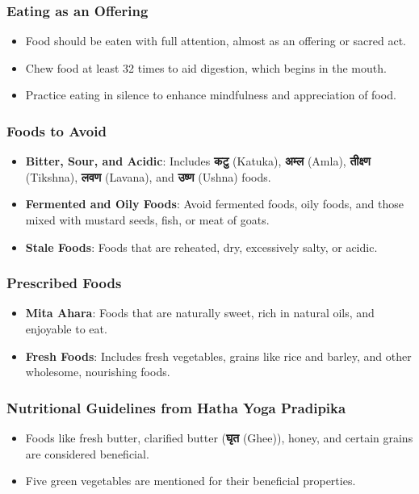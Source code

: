 \begin{frame}[fragile]\frametitle{Eating as an Offering}
    \begin{itemize}
        \item Food should be eaten with full attention, almost as an offering or sacred act.
        \item Chew food at least 32 times to aid digestion, which begins in the mouth.
        \item Practice eating in silence to enhance mindfulness and appreciation of food.
    \end{itemize}
\end{frame}


\begin{frame}[fragile]\frametitle{Foods to Avoid}
    \begin{itemize}
        \item \textbf{Bitter, Sour, and Acidic}: Includes \textbf{कटु} (Katuka), \textbf{अम्ल} (Amla), \textbf{तीक्ष्ण} (Tikshna), \textbf{लवण} (Lavana), and \textbf{उष्ण} (Ushna) foods.
        \item \textbf{Fermented and Oily Foods}: Avoid fermented foods, oily foods, and those mixed with mustard seeds, fish, or meat of goats.
        \item \textbf{Stale Foods}: Foods that are reheated, dry, excessively salty, or acidic.
    \end{itemize}
\end{frame}

\begin{frame}[fragile]\frametitle{Prescribed Foods}
    \begin{itemize}
        \item \textbf{Mita Ahara}: Foods that are naturally sweet, rich in natural oils, and enjoyable to eat.
        \item \textbf{Fresh Foods}: Includes fresh vegetables, grains like rice and barley, and other wholesome, nourishing foods.
    \end{itemize}
\end{frame}


\begin{frame}[fragile]\frametitle{Nutritional Guidelines from Hatha Yoga Pradipika}
    \begin{itemize}
        \item Foods like fresh butter, clarified butter (\textbf{घृत} (Ghee)), honey, and certain grains are considered beneficial.
        \item Five green vegetables are mentioned for their beneficial properties.
    \end{itemize}
\end{frame}

